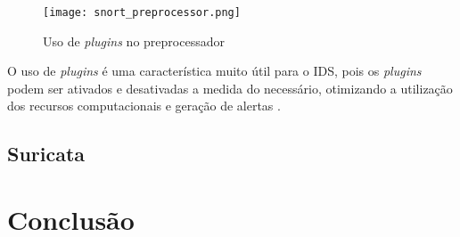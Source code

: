 \begin{figure}[!htb]
  \centering
  \caption{Uso de \textit{plugins} no preprocessador} \label{fig_snort_preprocessor}
  \texttt{[image: snort\_preprocessor.png]}
\end{figure}

O uso de \textit{plugins} é uma característica muito útil para o IDS, pois os \textit{plugins} podem ser ativados e desativadas a medida do necessário, otimizando a utilização dos recursos computacionais e geração de alertas \cite{snort:andrew}.

\subsection{Suricata} \label{sec:suricata}
\section{Conclusão} \label{sec:idps-conclusao}

